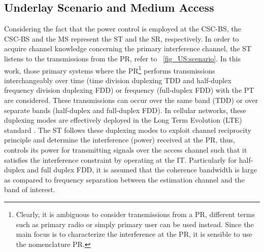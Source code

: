 \subsection{Underlay Scenario and Medium Access}

Considering the fact that the power control is employed at the CSC-BS, the CSC-BS and the MS represent the ST and the SR, respectively. In order to acquire channel knowledge concerning the primary interference channel, the ST listens to the transmissions from the PR, refer to \figurename~\ref{fig_US:scenario}. In this work, those primary systems where the PR\footnote{Clearly, it is ambiguous to consider transmissions from a PR, different terms such as primary radio or simply primary user can be used instead. Since the main focus is to characterize the interference at the PR, it is sensible to use the nomenclature PR.} performs transmissions interchangeably over time (time division duplexing TDD and half-duplex frequency division duplexing FDD) or frequency (full-duplex FDD) with the PT are considered. These transmissions can occur over the same band (TDD) or over separate bands (half-duplex and full-duplex FDD). 
In cellular networks, these duplexing modes are effectively deployed in the Long Term Evolution (LTE) standard \cite{LTE09}. The ST follows these duplexing modes to exploit channel reciprocity principle and determine the interference (power) received at the PR, thus, controls its power for transmitting signals over the access channel such that it satisfies the interference constraint by operating at the IT. Particularly for half-duplex and full duplex FDD, it is assumed that the coherence bandwidth is large as compared to frequency separation between the estimation channel and the band of interest. 

